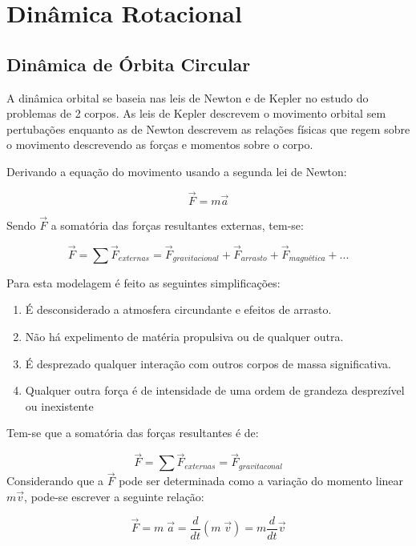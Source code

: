 \section{Dinâmica Rotacional}\label{sec:3.1.3}

\subsection{Dinâmica de Órbita Circular}\label{sec:3.1.3.1}

A dinâmica orbital se baseia nas leis de Newton e de Kepler no estudo do problemas de 2 corpos. As leis de Kepler descrevem o movimento orbital sem pertubações enquanto as de Newton descrevem as relações físicas que regem sobre o movimento descrevendo as forças e momentos sobre o corpo.

Derivando a equação do movimento usando a segunda lei de Newton:

\begin{equation}
\vec{F}=m\vec{a}
\end{equation}

Sendo $\vec{F}$ a somatória das forças resultantes externas, tem-se:

\begin{equation}
\vec{F}=\sum\vec{F}_{externas}=\vec{F}_{gravitacional}+\vec{F}_{arrasto}+\vec{F}_{magnética}+...
\end{equation}

Para esta modelagem é feito as seguintes simplificações:
\begin{enumerate}
\item É desconsiderado a atmosfera circundante e efeitos de arrasto.
\item Não há expelimento de matéria propulsiva ou de qualquer outra.
\item É desprezado qualquer interação com outros corpos de massa significativa.
\item Qualquer outra força é de intensidade de uma ordem de grandeza desprezível ou inexistente
\end{enumerate}

Tem-se que a somatória das forças resultantes é de:

\begin{equation}
\vec{F}=\sum\vec{F}_{externas}=\vec{F}_{gravitaconal}
\end{equation}Considerando que a $\vec{F}$ pode ser determinada como a variação do momento linear $m\vec{v}$, pode-se escrever a seguinte relação:

\begin{equation}\vec{F}=m\;\vec{a} = \frac{d}{dt}(m\;\vec{v})=m\frac{d}{dt}\vec{v}\end{equation}

